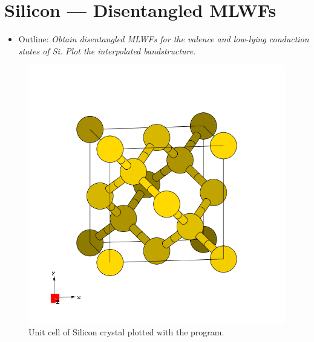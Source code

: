 \section{Silicon --- Disentangled MLWFs}
\label{sec3:silicon}
\begin{itemize}
\item Outline: {\it Obtain disentangled MLWFs for the valence and low-lying conduction states of Si. Plot the interpolated bandstructure.}
\end{itemize}

\begin{figure}[h!]
\centering
\includegraphics[width=0.25\columnwidth,trim={45pt 45pt 55pt 55pt},clip]{figure/example03/silicon.png}
\caption{Unit cell of Silicon crystal plotted with the \xcrysden{} program.}
\label{fig3.0}
\end{figure}


